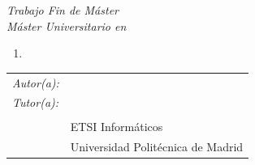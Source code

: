 \begin{titlepage}
\vspace*{4cm}
\noindent
\textit{Trabajo Fin de Máster}\\
\textit{Máster Universitario en} \Master{}

\begin{enumerate}
\item[\textit{Título:}] \TituloTFM{}
\end{enumerate}
\Fecha


\vspace*{3cm}

\noindent
\begin{tabular}{ll}
\textit{Autor(a):} & \NombreAutor{}  \\ 
\textit{Tutor(a):} & \NombreTutor{}  \\ 
                & \Departamento{} \\
                & ETSI Informáticos\\
                & Universidad Politécnica de Madrid
\end{tabular} 

\end{titlepage}
